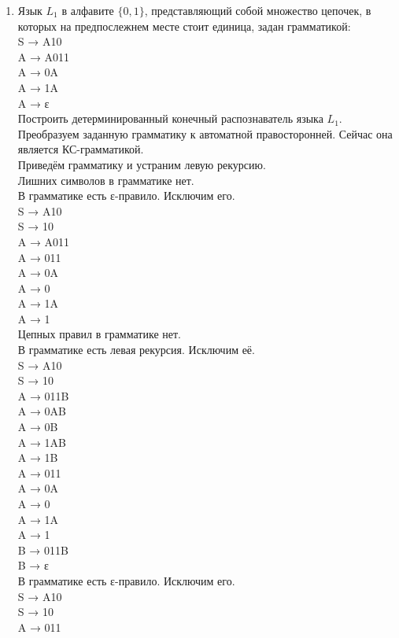 \documentclass[a4paper,14pt]{extarticle}
\begin{document}
\begin{enumerate}[1.]
    \item Язык $L_1$ в алфавите $\{0,1\}$, представляющий собой множество цепочек, в которых на предпослежнем месте стоит единица, задан грамматикой:\\
    S → A10\\
    A → A011\\
    A → 0A\\
    A → 1A\\
    A → ε\\
    Построить детерминированный конечный распознаватель языка $L_1$.\bigbreak
    Преобразуем заданную грамматику к автоматной правосторонней. Сейчас она является КС-грамматикой.\\
    Приведём грамматику и устраним левую рекурсию.\\
    Лишних символов в грамматике нет.\\
    В грамматике есть ε-правило. Исключим его.\\
    S → A10\\
    S → 10\\
    A → A011\\
    A → 011\\
    A → 0A\\
    A → 0\\
    A → 1A\\
    A → 1\\
    Цепных правил в грамматике нет.\\
    В грамматике есть левая рекурсия. Исключим её.\\
    S → A10\\
    S → 10\\
    A → 011B\\
    A → 0AB\\
    A → 0B\\
    A → 1AB\\
    A → 1B\\
    A → 011\\
    A → 0A\\
    A → 0\\
    A → 1A\\
    A → 1\\
    B → 011B\\
    B → ε\\
    В грамматике есть ε-правило. Исключим его.\\
    S → A10\\
    S → 10\\
    A → 011\\

\end{enumerate}
\end{document}
